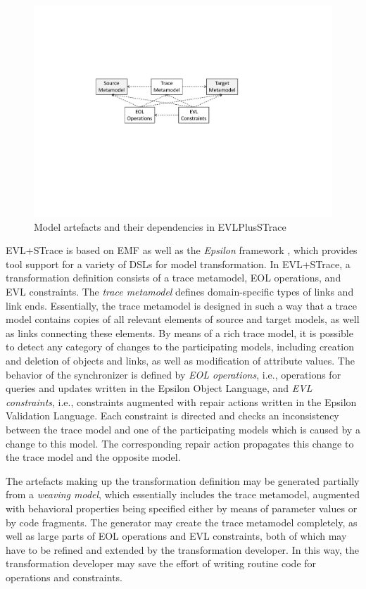 \begin{figure}[tb!]
	\centering
	\includegraphics[width=0.8\columnwidth]{diagrams/solutions/EVLPlusSTraceArtefacts}
	\caption{Model artefacts and their dependencies in EVLPlusSTrace}
	\label{fig:evlartefacts}
\end{figure}

EVL+STrace is based on EMF as well as the \emph{Epsilon} framework \cite{epsilon}, which provides tool support for a variety of DSLs for model transformation. In EVL+STrace, a transformation definition consists of a trace metamodel, EOL operations, and EVL constraints. The \emph{trace metamodel} defines domain-specific types of links and link ends. Essentially, the trace metamodel is designed in such a way that a trace model contains copies of all relevant elements of source and target models, as well as links connecting these elements. By means of a rich trace model, it is possible to detect any category of changes to the participating models, including creation and deletion of objects and links, as well as modification of attribute values. The behavior of the synchronizer is defined by \emph{EOL operations}, i.e., operations for queries and updates written in the Epsilon Object Language, and \emph{EVL constraints}, i.e., constraints augmented with repair actions written in the Epsilon Validation Language. Each constraint is directed and checks an inconsistency between the trace model and one of the participating models which is caused by a change to this model. The corresponding repair action propagates this change to the trace model and the opposite model.

The artefacts making up the transformation definition may be generated partially from a \emph{weaving model}, which essentially includes the trace metamodel, augmented with behavioral properties being specified either by means of parameter values or by code fragments. The generator may create the trace metamodel completely, as well as large parts of EOL operations and EVL constraints, both of which may have to be refined and extended by the transformation developer. In this way, the transformation developer may save the effort of writing routine code for operations and constraints.

